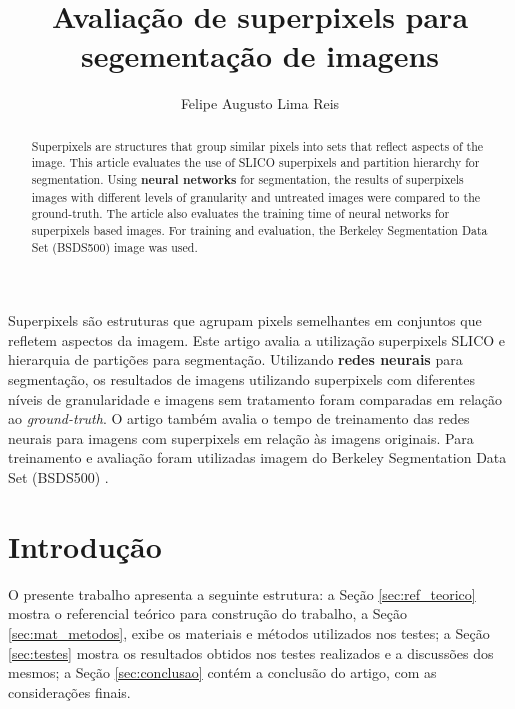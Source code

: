 \title{Avaliação de superpixels para segementação de imagens}
\author{Felipe Augusto Lima Reis\inst{1}}
\begin{document}
 

\maketitle

\begin{abstract}
  Superpixels are structures that group similar pixels into sets that reflect aspects of the image. This article evaluates the use of SLICO superpixels and partition hierarchy for segmentation. Using \textbf{neural networks} for segmentation, the results of superpixels images with different levels of granularity and untreated images were compared to the ground-truth. The article also evaluates the training time of neural networks for superpixels based images. For training and evaluation, the Berkeley Segmentation Data Set (BSDS500) \cite{BSDS500} image was used.
\end{abstract}
     
\begin{resumo} 
  Superpixels são estruturas que agrupam pixels semelhantes em conjuntos que refletem aspectos da imagem. Este artigo avalia a utilização superpixels SLICO e hierarquia de partições para segmentação. Utilizando \textbf{redes neurais} para segmentação, os resultados de imagens utilizando superpixels com diferentes níveis de granularidade e imagens sem tratamento foram comparadas em relação ao \textit{ground-truth}. O artigo também avalia o tempo de treinamento das redes neurais para imagens com superpixels em relação às imagens originais. Para treinamento e avaliação foram utilizadas imagem do Berkeley Segmentation Data Set (BSDS500) \cite{BSDS500}.
\end{resumo}


\section{Introdução} \label{sec:introducao}

O presente trabalho apresenta a seguinte estrutura: a Seção \ref{sec:ref_teorico} mostra o referencial teórico para construção do trabalho, a Seção  \ref{sec:mat_metodos}, exibe os materiais e métodos utilizados nos testes; a Seção \ref{sec:testes} mostra os resultados obtidos nos testes realizados e a discussões dos mesmos; a Seção \ref{sec:conclusao} contém a conclusão do artigo, com as considerações finais.

\end{document}
